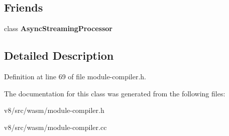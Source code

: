 \subsection*{Friends}
\begin{DoxyCompactItemize}
\item 
\mbox{\label{classv8_1_1internal_1_1wasm_1_1AsyncCompileJob_af3171ef1750bbdf429a8319ca3aa9f3e}} 
class {\bfseries Async\+Streaming\+Processor}
\end{DoxyCompactItemize}


\subsection{Detailed Description}


Definition at line 69 of file module-\/compiler.\+h.



The documentation for this class was generated from the following files\+:\begin{DoxyCompactItemize}
\item 
v8/src/wasm/module-\/compiler.\+h\item 
v8/src/wasm/module-\/compiler.\+cc\end{DoxyCompactItemize}
